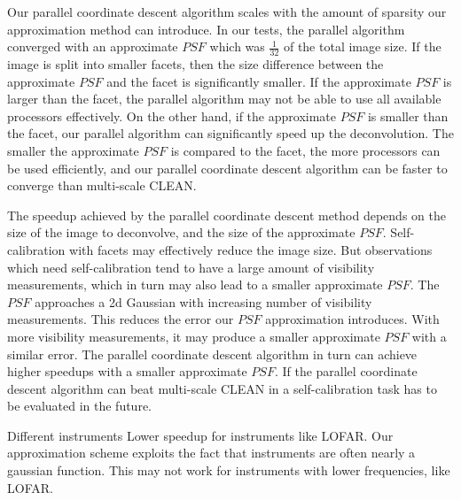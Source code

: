 Our parallel coordinate descent algorithm scales with the amount of sparsity our approximation method can introduce. In our tests, the parallel algorithm converged with an approximate $PSF$ which was $\frac{1}{32}$ of the total image size. If the image is split into smaller facets, then the size difference between the approximate $PSF$ and the facet is significantly smaller. If the approximate $PSF$ is larger than the facet, the parallel algorithm may not be able to use all available processors effectively. On the other hand, if the approximate $PSF$ is smaller than the facet, our parallel algorithm can significantly speed up the deconvolution. The smaller the approximate $PSF$ is compared to the facet, the more processors can be used efficiently, and our parallel coordinate descent algorithm can be faster to converge than multi-scale CLEAN.

The speedup achieved by the parallel coordinate descent method depends on the size of the image to deconvolve, and the size of the approximate $PSF$. Self-calibration with facets may effectively reduce the image size. But observations which need self-calibration tend to have a large amount of visibility measurements, which in turn may also lead to a smaller approximate $PSF$. The $PSF$ approaches a 2d Gaussian with increasing number of visibility measurements. This reduces the error our $PSF$ approximation introduces. With more visibility measurements, it may produce a smaller approximate $PSF$ with a similar error. The parallel coordinate descent algorithm in turn can achieve higher speedups with a smaller approximate $PSF$. If the parallel coordinate descent algorithm can beat multi-scale CLEAN in a self-calibration task has to be evaluated in the future.

Different instruments
Lower speedup for instruments like LOFAR. 
Our approximation scheme exploits the fact that instruments are often nearly a gaussian function. This may not work for instruments with lower frequencies, like LOFAR.



